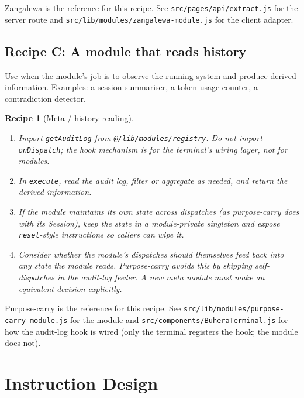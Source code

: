 \documentclass[11pt,a4paper]{article}
\theoremstyle{contract}
\newtheorem{recipe}[contract]{Recipe}
\begin{document}
Zangalewa is the reference for this recipe. See
\texttt{src/pages/api/extract.js} for the server route and
\texttt{src/lib/modules/zangalewa-module.js} for the client adapter.

\subsection{Recipe C: A module that reads history}

Use when the module's job is to observe the running system and produce
derived information. Examples: a session summariser, a token-usage
counter, a contradiction detector.

\begin{recipe}[Meta / history-reading]
\label{recipe:meta}
\begin{enumerate}[leftmargin=1.4em,itemsep=1pt]
\item Import \texttt{getAuditLog} from \texttt{@/lib/modules/registry}.
Do not import \texttt{onDispatch}; the hook mechanism is for the
terminal's wiring layer, not for modules.
\item In \texttt{execute}, read the audit log, filter or aggregate as
needed, and return the derived information.
\item If the module maintains its own state across dispatches (as
purpose-carry does with its Session), keep the state in a
module-private singleton and expose \texttt{reset}-style instructions
so callers can wipe it.
\item Consider whether the module's dispatches should themselves feed
back into any state the module reads. Purpose-carry avoids this by
skipping self-dispatches in the audit-log feeder. A new meta module
must make an equivalent decision explicitly.
\end{enumerate}
\end{recipe}

Purpose-carry is the reference for this recipe. See
\texttt{src/lib/modules/purpose-carry-module.js} for the module and
\texttt{src/components/BuheraTerminal.js} for how the audit-log hook
is wired (only the terminal registers the hook; the module does not).

\section{Instruction Design}
\label{sec:instruction-design}
\end{document}
